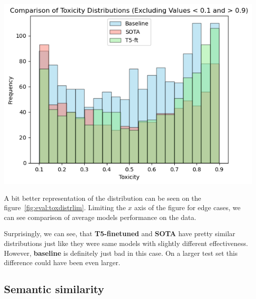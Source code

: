 \begin{multicols*}{2}
\begin{minipage}{0.9\linewidth}
    \includegraphics[scale=0.35]{figures/final/toxicity-limited.png}%
    \label{fig:eval:toxdistrlim}%
\end{minipage}

A bit better representation of the distribution can be seen on the
figure~\ref{fig:eval:toxdistrlim}. Limiting the \(x\) axis of the figure for
edge cases, we can see comparison of average models performance on the data.

Surprisingly, we can see, that \textbf{T5-finetuned} and \textbf{SOTA} have
pretty similar distributions just like they were same models with slightly
different effectiveness. However, \textbf{baseline} is definitely just bad in
this case. On a larger test set this difference could have been even larger.

\subsection{Semantic similarity}


\end{multicols*}
